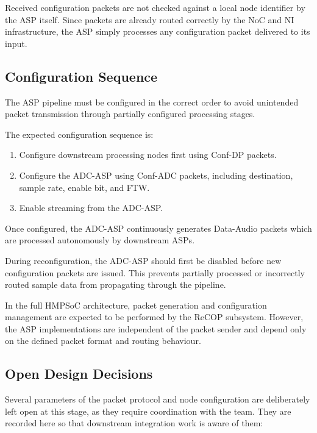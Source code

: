 \documentclass[10pt, a4paper]{article}
\begin{document}
Received configuration packets are not checked against a local node identifier by the ASP itself. Since packets are already routed correctly by the NoC and NI infrastructure, the ASP simply processes any configuration packet delivered to its input.

\subsection{Configuration Sequence}

The ASP pipeline must be configured in the correct order to avoid unintended packet transmission through partially configured processing stages.

The expected configuration sequence is:

\begin{enumerate}
    \item Configure downstream processing nodes first using Conf-DP packets.
    \item Configure the ADC-ASP using Conf-ADC packets, including destination, sample rate, enable bit, and FTW.
    \item Enable streaming from the ADC-ASP.
\end{enumerate}

Once configured, the ADC-ASP continuously generates Data-Audio packets which are processed autonomously by downstream ASPs.

During reconfiguration, the ADC-ASP should first be disabled before new configuration packets are issued. This prevents partially processed or incorrectly routed sample data from propagating through the pipeline.

In the full HMPSoC architecture, packet generation and configuration management are expected to be performed by the ReCOP subsystem. However, the ASP implementations are independent of the packet sender and depend only on the defined packet format and routing behaviour.

\subsection{Open Design Decisions}

Several parameters of the packet protocol and node configuration are deliberately left open at this stage, as they require coordination with the team. They are recorded here so that downstream integration work is aware of them:
\end{document}
